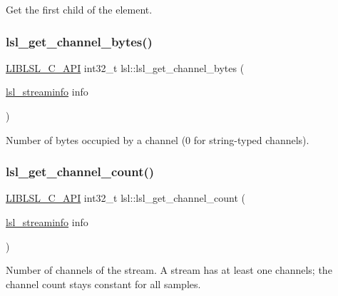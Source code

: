 Get the first child of the element. \mbox{\label{namespacelsl_aa11d6865aa57caf51f5d13c66a785b30}} 
\subsubsection{\texorpdfstring{lsl\+\_\+get\+\_\+channel\+\_\+bytes()}{lsl\_get\_channel\_bytes()}}
{\footnotesize\ttfamily \hyperlink{lsl__cpp_8h_aafd0ef1813e8be84a1420c4f1df64615}{L\+I\+B\+L\+S\+L\+\_\+\+C\+\_\+\+A\+PI} int32\+\_\+t lsl\+::lsl\+\_\+get\+\_\+channel\+\_\+bytes (\begin{DoxyParamCaption}\item[{\hyperlink{namespacelsl_aa0a9ce9956061679949daa2e35aae2e8}{lsl\+\_\+streaminfo}}]{info }\end{DoxyParamCaption})}



Number of bytes occupied by a channel (0 for string-\/typed channels). 

\mbox{\label{namespacelsl_a40acd87a21d3c91a524bd72012dc3328}} 
\subsubsection{\texorpdfstring{lsl\+\_\+get\+\_\+channel\+\_\+count()}{lsl\_get\_channel\_count()}}
{\footnotesize\ttfamily \hyperlink{lsl__cpp_8h_aafd0ef1813e8be84a1420c4f1df64615}{L\+I\+B\+L\+S\+L\+\_\+\+C\+\_\+\+A\+PI} int32\+\_\+t lsl\+::lsl\+\_\+get\+\_\+channel\+\_\+count (\begin{DoxyParamCaption}\item[{\hyperlink{namespacelsl_aa0a9ce9956061679949daa2e35aae2e8}{lsl\+\_\+streaminfo}}]{info }\end{DoxyParamCaption})}

Number of channels of the stream. A stream has at least one channels; the channel count stays constant for all samples. \mbox{\label{namespacelsl_a70c26257a8f3042084140a85a867a300}} 
